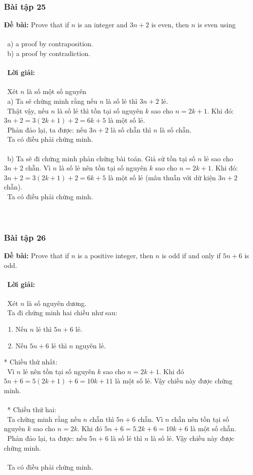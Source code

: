 \documentclass[a4paper]{article}
\begin{document}
\subsubsection{Bài tập 25}
\textbf{Đề bài: } Prove that if $n$ is an integer and $3n + 2$ is even, then $n$ is even using \\\ \\\
a) a proof by contraposition. \\\
b) a proof by contradiction.\\\ \\\
\textbf{Lời giải:} \\\ \\\
Xét $n$ là số một số nguyên \\\
a) Ta sẽ chứng minh rằng nếu $n$ là số lẻ thì $3n+2$ lẻ. \\\
Thật vậy, nếu $n$ là số lẻ thì tồn tại số nguyên $k$ sao cho $n = 2k+1$. Khi đó: $3n+2 = 3(2k+1)+2 = 6k + 5$ là một số lẻ.\\\
Phản đảo lại, ta được: nếu $3n+2$ là số chẵn thì $n$ là số chẵn. \\\
Ta có điều phải chứng minh. \\\ \\\
b) Ta sẽ đi chứng minh phản chứng bài toán. Giả sử tồn tại số $n$ lẻ sao cho $3n+2$ chẵn. Vì $n$ là số lẻ nên tồn tại số nguyên $k$ sao cho $n = 2k+1$. Khi đó: $3n+2 = 3(2k+1)+2 = 6k + 5$ là một số lẻ (mâu thuẫn với dữ kiện $3n+2$ chẵn). \\\
Ta có điều phải chứng minh.
\\\ \\\
\clearpage
\subsubsection{Bài tập 26}
\textbf{Đề bài: } Prove that if $n$ is a positive integer, then $n$ is odd if and only if $5n + 6$ is odd.\\\ \\\
\textbf{Lời giải:} \\\ \\\
Xét $n$ là số nguyên dương. \\\
Ta đi chứng minh hai chiều như sau:
\begin{enumerate}
\item Nếu $n$ lẻ thì $5n+6$ lẻ.
\item Nếu $5n+6$ lẻ thì $n$ nguyên lẻ.
\end{enumerate}
* Chiều thứ nhất: \\\
Vì $n$ lẻ nên tồn tại số nguyên $k$ sao cho $n=2k+1$. Khi đó $5n+6=5(2k+1)+6=10k+11$ là một số lẻ. Vậy chiều này được chứng minh. \\\ \\\
* Chiều thứ hai: \\\
Ta chứng minh rằng nếu $n$ chẵn thì $5n+6$ chẵn. Vì $n$ chẵn nên tồn tại số nguyên $k$ sao cho $n=2k$. Khi đó $5n+6=5.2k+6=10k+6$ là một số chẵn. \\\
Phản đảo lại, ta được: nếu $5n+6$ là số lẻ thì $n$ là số lẻ. Vậy chiều này được chứng minh. \\\ \\\
Ta có điều phải chứng minh.
\end{document}
